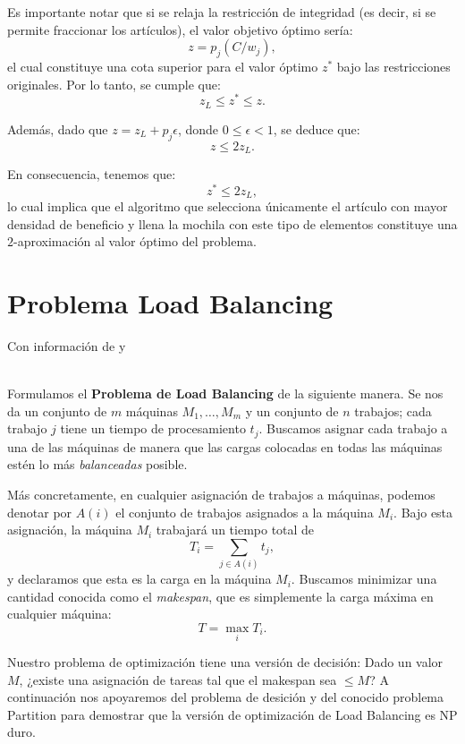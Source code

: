\documentclass{report}
\begin{document}
Es importante notar que si se relaja la restricción de integridad (es decir, si se permite fraccionar los artículos), el valor objetivo óptimo sería:
\[
z = p_j (C / w_j),
\]
el cual constituye una cota superior para el valor óptimo $ z^* $ bajo las restricciones originales. Por lo tanto, se cumple que:
\[
z_L \leq z^* \leq z.
\]

Además, dado que $ z = z_L + p_j \epsilon $, donde $ 0 \leq \epsilon < 1 $, se deduce que:
\[
z \leq 2z_L.
\]

En consecuencia, tenemos que:
\[
z^* \leq 2z_L,
\]
lo cual implica que el algoritmo que selecciona únicamente el artículo con mayor densidad de beneficio y llena la mochila con este tipo de elementos constituye una $ 2 $-aproximación al valor óptimo del problema.


	\chapter{Problema Load Balancing}
	
	{Con información de \cite{Kleinberg2005} y \cite{Garey1979}\\\\}
	
	Formulamos el \textbf{Problema de Load Balancing} de la siguiente manera. Se nos da un conjunto de \( m \) máquinas \( M_1, \dots, M_m \) y un conjunto de \( n \) trabajos; cada trabajo \( j \) tiene un tiempo de procesamiento \( t_j \). Buscamos asignar cada trabajo a una de las máquinas de manera que las cargas colocadas en todas las máquinas estén lo más \textit{balanceadas} posible.
	
	Más concretamente, en cualquier asignación de trabajos a máquinas, podemos denotar por \( A(i) \) el conjunto de trabajos asignados a la máquina \( M_i \). Bajo esta asignación, la máquina \( M_i \) trabajará un tiempo total de
	\[
	T_i = \sum_{j \in A(i)} t_j,
	\]
	y declaramos que esta es la carga en la máquina \( M_i \). Buscamos minimizar una cantidad conocida como el \textit{makespan}, que es simplemente la carga máxima en cualquier máquina:
	\[
	T = \max_i T_i.
	\]
	


	Nuestro problema de optimización tiene una versión de decisión: Dado un valor $ M $, ¿existe una asignación de tareas tal que el makespan sea $ \leq M $?
	A continuación nos apoyaremos del problema de desición y del conocido problema Partition para demostrar que la versión de optimización de Load Balancing es NP duro.
	
\end{document}
